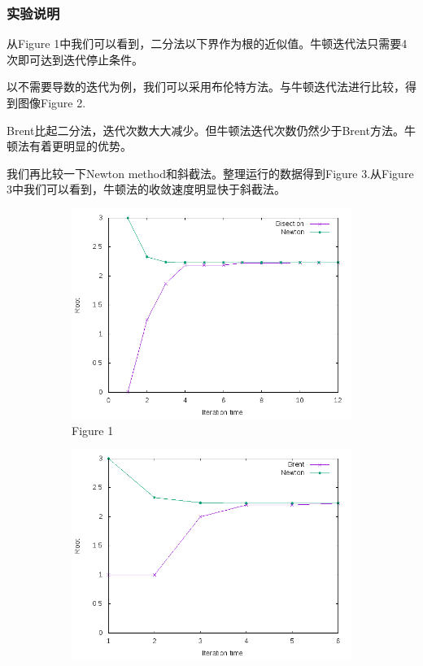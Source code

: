 \documentclass{beamer}
\begin{document}
\begin{frame}
\frametitle{实验说明}
从Figure 1中我们可以看到，二分法以下界作为根的近似值。牛顿迭代法只需要4次即可达到迭代停止条件。

以不需要导数的迭代为例，我们可以采用布伦特方法。与牛顿迭代法进行比较，得到图像Figure 2.

Brent比起二分法，迭代次数大大减少。但牛顿法迭代次数仍然少于Brent方法。牛顿法有着更明显的优势。

我们再比较一下Newton method和斜截法。整理运行的数据得到Figure 3.从Figure 3中我们可以看到，牛顿法的收敛速度明显快于斜截法。
\begin{figure}[H]
  \begin{subfigure}{0.3\linewidth}
  \centering
  \includegraphics[width=1\textwidth]{graph1.png}
  \caption{Figure 1}
  \label{fig:1}
  \end{subfigure}
  \begin{subfigure}{0.3\linewidth}
  \centering
  \includegraphics[width=1\textwidth]{graph2.png}

\end{subfigure}
\end{figure}
\end{frame}
\end{document}

